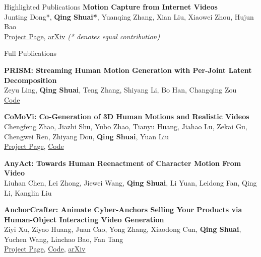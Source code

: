 \documentclass{resume}
\begin{document}
\begin{rSection}{Highlighted Publications}
    {\bf Motion Capture from Internet Videos}\hfill{ } \\
    Junting Dong*, \textbf{Qing Shuai*}, Yuanqing Zhang, Xian Liu, Xiaowei Zhou, Hujun Bao\\
    \href{https://zju3dv.github.io/iMoCap/}{Project Page}, \href{https://arxiv.org/abs/2008.07931}{arXiv} {\em (* denotes equal contribution)}

\end{rSection}

\begin{rSection}{Full Publications}

    {\bf PRISM: Streaming Human Motion Generation with Per-Joint Latent Decomposition}\hfill{ } \\
    Zeyu Ling, \textbf{Qing Shuai}, Teng Zhang, Shiyang Li, Bo Han, Changqing Zou\\
    \href{https://github.com/ZeyuLing/PRISM}{Code}

    {\bf CoMoVi: Co-Generation of 3D Human Motions and Realistic Videos}\hfill{ } \\
    Chengfeng Zhao, Jiazhi Shu, Yubo Zhao, Tianyu Huang, Jiahao Lu, Zekai Gu, Chengwei Ren, Zhiyang Dou, \textbf{Qing Shuai}, Yuan Liu\\
    \href{https://igl-hkust.github.io/CoMoVi/}{Project Page}, \href{https://github.com/IGL-HKUST/CoMoVi}{Code}

    {\bf AnyAct: Towards Human Reenactment of Character Motion From Video}\hfill{ } \\
    Liuhan Chen, Lei Zhong, Jiewei Wang, \textbf{Qing Shuai}, Li Yuan, Leidong Fan, Qing Li, Kanglin Liu

    {\bf AnchorCrafter: Animate Cyber-Anchors Selling Your Products via Human-Object Interacting Video Generation}\hfill{ } \\
    Ziyi Xu, Ziyao Huang, Juan Cao, Yong Zhang, Xiaodong Cun, \textbf{Qing Shuai}, Yuchen Wang, Linchao Bao, Fan Tang\\
    \href{https://cangcz.github.io/Anchor-Crafter/}{Project Page}, \href{https://github.com/cangcz/AnchorCrafter}{Code}, \href{https://arxiv.org/abs/2411.17383}{arXiv}


\end{rSection}
\end{document}
